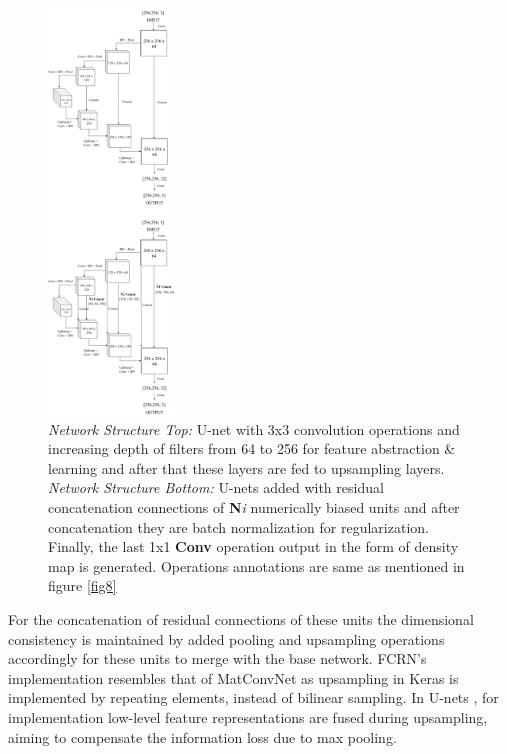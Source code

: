 \documentclass[conference]{IEEEtran}
\begin{document}
\begin{figure}[!h]
\centering
\includegraphics[width=0.30\textwidth]{assets/u-net-nalu.png}
\caption{\textit{Network Structure Top: }U-net with 3x3 convolution operations and increasing depth of filters from 64 to 256 for feature abstraction \& learning and after that these layers are fed to upsampling layers. \textit{Network Structure Bottom: } U-nets added with residual concatenation connections of \textbf{N}\textit{i} numerically biased units and after concatenation they are batch normalization for regularization. Finally, the last 1x1 \textbf{Conv} operation output in the form of density map is generated. Operations annotations are same as mentioned in figure \ref{fig8} \newline}
\label{fig9}
\end{figure}

For the concatenation of residual connections of these units the dimensional consistency is maintained by added pooling and upsampling operations accordingly for these units to merge with the base network. FCRN’s implementation resembles that of MatConvNet \cite{b30} as upsampling in Keras is implemented by repeating elements, instead of bilinear sampling. In U-nets \cite{b8}, for implementation low-level feature representations are fused during upsampling, aiming to compensate the information loss due to max pooling.
\end{document}
